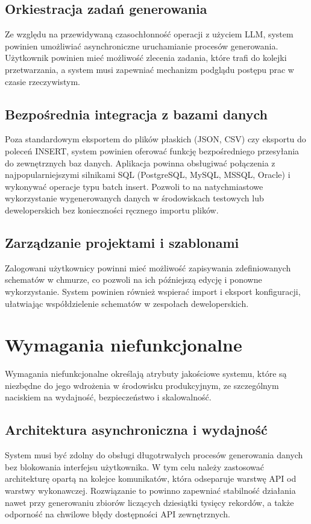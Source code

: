 \subsection*{Orkiestracja zadań generowania}
Ze względu na przewidywaną czasochłonność operacji z użyciem \gls{LLM}, system powinien umożliwiać asynchroniczne uruchamianie procesów generowania. Użytkownik powinien mieć możliwość zlecenia zadania, które trafi do kolejki przetwarzania, a system musi zapewniać mechanizm podglądu postępu prac w czasie rzeczywistym.

\subsection*{Bezpośrednia integracja z bazami danych}
Poza standardowym eksportem do plików płaskich (\gls{JSON}, \gls{CSV}) czy eksportu do poleceń INSERT, system powinien oferować funkcję bezpośredniego przesyłania do zewnętrznych baz danych. Aplikacja powinna obsługiwać połączenia z najpopularniejszymi silnikami \gls{SQL} (PostgreSQL, MySQL, MSSQL, Oracle) i wykonywać operacje typu batch insert. Pozwoli to na natychmiastowe wykorzystanie wygenerowanych danych w środowiskach testowych lub deweloperskich bez konieczności ręcznego importu plików.

\subsection*{Zarządzanie projektami i szablonami}
Zalogowani użytkownicy powinni mieć możliwość zapisywania zdefiniowanych schematów w chmurze, co pozwoli na ich późniejszą edycję i ponowne wykorzystanie. System powinien również wspierać import i eksport konfiguracji, ułatwiając współdzielenie schematów w zespołach deweloperskich.

\section*{Wymagania niefunkcjonalne}
Wymagania niefunkcjonalne określają atrybuty jakościowe systemu, które są niezbędne do jego wdrożenia w środowisku produkcyjnym, ze szczególnym naciskiem na wydajność, bezpieczeństwo i skalowalność.

\subsection*{Architektura asynchroniczna i wydajność}
System musi być zdolny do obsługi długotrwałych procesów generowania danych bez blokowania interfejsu użytkownika. W tym celu należy zastosować architekturę opartą na kolejce komunikatów, która odseparuje warstwę \gls{API} od warstwy wykonawczej. Rozwiązanie to powinno zapewniać stabilność działania nawet przy generowaniu zbiorów liczących dziesiątki tysięcy rekordów, a także odporność na chwilowe błędy dostępności \gls{API} zewnętrznych.

